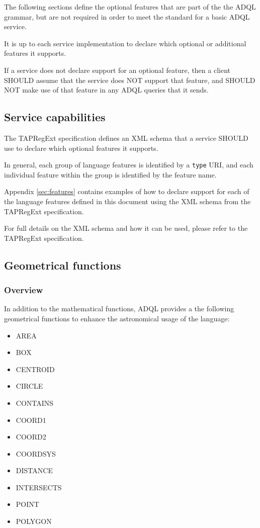 \documentclass[11pt,a4paper]{ivoa}
\newcommand{\TAPRegExtSpec}{TAPRegExt specification\xspace}
\newcommand{\AppendixRef}[1]{Appendix \ref{#1}\xspace}
\begin{document}
The following sections define the optional features that are part of the
the ADQL grammar, but are not required in order to meet the standard for
a basic ADQL service.

It is up to each service implementation to declare which optional or
additional features it supports.

If a service does not declare support for an optional feature,
then a client SHOULD assume that the service does NOT support
that feature, and SHOULD NOT make use of that feature in any
ADQL queries that it sends.

\subsection{Service capabilities}
\label{sec:capabilities}

The \TAPRegExtSpec defines an XML schema that a service SHOULD
use to declare which optional features it supports.

In general, each group of language features is identified by a \verb:type:
URI, and each individual feature within the group is identified by the
feature name.

\AppendixRef{sec:features} contains examples of how to declare support
for each of the language features defined in this document using the
XML schema from the \TAPRegExtSpec.

For full details on the XML schema and how it can be used, please refer to
the \TAPRegExtSpec.

\subsection{Geometrical functions}
\label{sec:functions.geom}
\subsubsection{Overview}
\label{sec:functions.geom.overview}

In addition to the mathematical functions, ADQL provides a the following geometrical
functions to enhance the astronomical usage of the language:

\begin{itemize}
    \item AREA
    \item BOX
    \item CENTROID
    \item CIRCLE
    \item CONTAINS
    \item COORD1
    \item COORD2
    \item COORDSYS
    \item DISTANCE
    \item INTERSECTS
    \item POINT
    \item POLYGON
\end{itemize}
\end{document}
